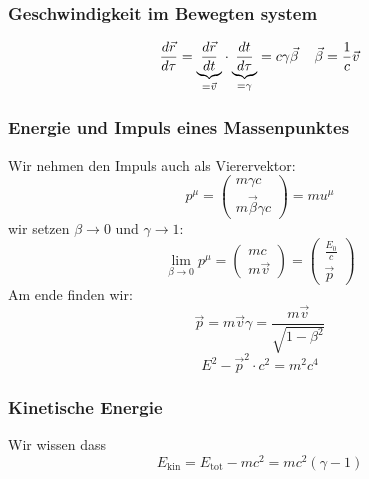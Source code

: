 \documentclass{article}
\newcommand{\mspc}{\hspace{0.4cm}}
\begin{document}
\subsubsection*{Geschwindigkeit im Bewegten system}
\[\frac{d\vec{r}}{d\tau}=\underset{=\vec{v}}{\underbrace{\frac{d\vec{r}}{dt}}}\cdot\underset{=\gamma}{\underbrace{\frac{dt}{d\tau}}}=c\gamma\vec{\beta}\mspc\vec{\beta}=\frac{1}{c}\vec{v}\]
\subsubsection*{Energie und Impuls eines Massenpunktes}Wir nehmen den Impuls auch als Vierervektor:\[p^\mu=\begin{pmatrix}m\gamma c\\m\vec{\beta}\gamma c\end{pmatrix}=m u^\mu\]
wir setzen $\beta\rightarrow0$ und $\gamma\rightarrow 1$:\[\lim_{\beta\rightarrow0}p^\mu=\begin{pmatrix}mc\\m\vec{v}\end{pmatrix}=\begin{pmatrix}\frac{E_0}{c}\\\vec{p}\end{pmatrix}\]
Am ende finden wir:\[\vec{p}=m\vec{v}\gamma=\frac{m\vec{v}}{\sqrt{1-\beta^2}}\]
\[E^2-\vec{p}^2\cdot c^2=m^2c^4\]
\subsubsection*{Kinetische Energie}
Wir wissen dass \[E_\text{kin}=E_\text{tot}-mc^2=mc^2(\gamma-1)\]
\end{document}
